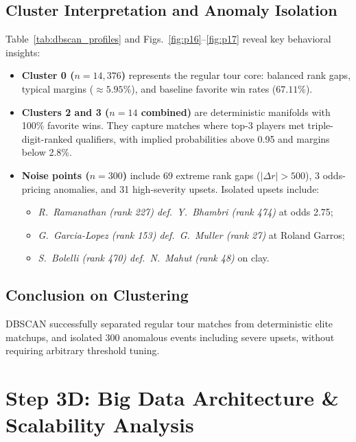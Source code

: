 \documentclass[10pt,journal]{IEEEtran}
\begin{document}
\subsection{Cluster Interpretation and Anomaly Isolation}
Table~\ref{tab:dbscan_profiles} and Figs.~\ref{fig:p16}--\ref{fig:p17} reveal key behavioral insights:
\begin{itemize}
    \item \textbf{Cluster 0 ($n=14{,}376$)} represents the regular tour core: balanced rank gaps, typical margins ($\approx 5.95\%$), and baseline favorite win rates ($67.11\%$).
    \item \textbf{Clusters 2 and 3 ($n=14$ combined)} are deterministic manifolds with 100\% favorite wins. They capture matches where top-3 players met triple-digit-ranked qualifiers, with implied probabilities above 0.95 and margins below 2.8\%.
    \item \textbf{Noise points ($n=300$)} include 69 extreme rank gaps ($|\Delta r| > 500$), 3 odds-pricing anomalies, and 31 high-severity upsets. Isolated upsets include:
    \begin{itemize}
        \item \textit{R.\ Ramanathan (rank 227) def.\ Y.\ Bhambri (rank 474)} at odds 2.75;
        \item \textit{G.\ Garcia-Lopez (rank 153) def.\ G.\ Muller (rank 27)} at Roland Garros;
        \item \textit{S.\ Bolelli (rank 470) def.\ N.\ Mahut (rank 48)} on clay.
    \end{itemize}
\end{itemize}

\subsection{Conclusion on Clustering}
DBSCAN successfully separated regular tour matches from deterministic elite matchups, and isolated 300 anomalous events including severe upsets, without requiring arbitrary threshold tuning.

\section{Step 3D: Big Data Architecture \& Scalability Analysis}
\end{document}
